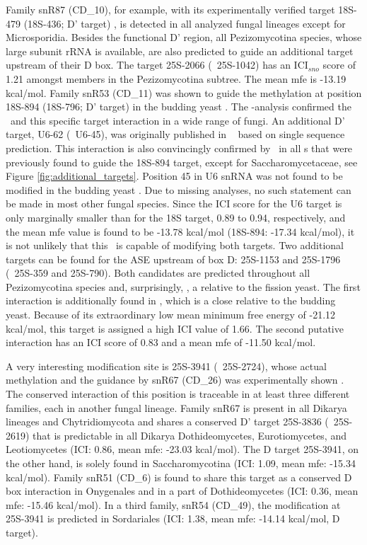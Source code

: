 Family snR87 (CD\_10), for example, with its experimentally verified target
18S-479 (18S-436; D' target) \cite{Davis:2006}, is detected in all analyzed
fungal lineages except for Microsporidia. Besides the functional D' region,
all Pezizomycotina species, whose large subunit rRNA is available, are also
predicted to guide an additional target upstream of their D box. The target
25S-2066 (\ncr\ 25S-1042) has an ICI$_{sno}$ score of 1.21 amongst members
in the Pezizomycotina subtree. The mean mfe is -13.19 kcal/mol.  Family
snR53 (CD\_11) was shown to guide the methylation at position 18S-894
(18S-796; D' target) in the budding yeast \cite{Lowe:1999}. The
\snostrip-analysis confirmed the \sno\ and this specific target interaction
in a wide range of fungi. An additional D' target, U6-62 (\sce\ U6-45), was
originally published in \ncr\ \cite{Liu:2009} based on single sequence
prediction. This interaction is also convincingly confirmed by \snostrip\
in all \sno s that were previously found to guide the 18S-894 target,
except for Saccharomycetaceae, see Figure
\ref{fig:additional_targets}. Position 45 in U6 snRNA was not found to be
modified in the budding yeast \cite{Machnicka:2013, Massenet:1998}. Due to
missing analyses, no such statement can be made in most other fungal
species. Since the ICI score for the U6 target is only marginally smaller
than for the 18S target, 0.89 to 0.94, respectively, and the mean mfe value
is found to be -13.78 kcal/mol (18S-894: -17.34 kcal/mol), it is not
unlikely that this \sno\ is capable of modifying both targets. Two
additional targets can be found for the ASE upstream of box D: 25S-1153 and
25S-1796 (\ncr\ 25S-359 and 25S-790). Both candidates are predicted
throughout all Pezizomycotina species and, surprisingly, \Tde, a relative
to the fission yeast. The first interaction is additionally found in \Yli,
which is a close relative to the budding yeast. Because of its
extraordinary low mean minimum free energy of -21.12 kcal/mol, this target
is assigned a high ICI value of 1.66. The second putative interaction has
an ICI score of 0.83 and a mean mfe of -11.50 kcal/mol.

A very interesting modification site is 25S-3941 (\sce\ 25S-2724), whose
actual methylation and the guidance by snR67 (CD\_26) was experimentally
shown \cite{Lowe:1999}. The conserved interaction of this position is
traceable in at least three different families, each in another fungal
lineage. Family snR67 is present in all Dikarya lineages and
Chytridiomycota and shares a conserved D' target 25S-3836 (\sce\ 25S-2619)
that is predictable in all Dikarya \PFS{with the exception of}
Dothideomycetes, Eurotiomycetes, and Leotiomycetes (ICI: 0.86, mean mfe:
-23.03 kcal/mol). The D target 25S-3941, on the other hand, is solely found
in Saccharomycotina (ICI: 1.09, mean mfe: -15.34 kcal/mol). Family snR51
(CD\_6) is found to share this target as a conserved D box interaction in
Onygenales and in a part of Dothideomycetes (ICI: 0.36, mean mfe: -15.46
kcal/mol). In a third family, snR54 (CD\_49), the modification at 25S-3941
is predicted in Sordariales (ICI: 1.38, mean mfe: -14.14 kcal/mol, D
target).

